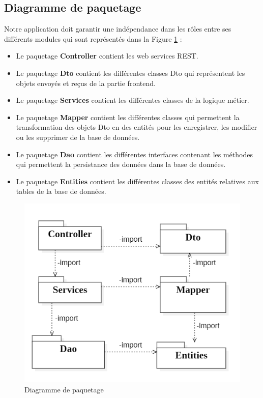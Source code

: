  \subsection{Diagramme de paquetage}
 Notre application doit garantir une indépendance dans les rôles entre ses différents modules qui sont représentés dans la Figure \ref{fig:diagram_package} :
 \begin{itemize}
     \item Le paquetage \textbf{Controller} contient les web services REST.
     \item Le paquetage \textbf{Dto} contient les différentes classes Dto qui représentent les objets envoyés et reçus de la partie frontend.
     \item Le paquetage \textbf{Services} contient les différentes classes de la logique métier.
     \item Le paquetage \textbf{Mapper} contient les différentes classes qui permettent la transformation des objets Dto en des entités pour les enregistrer, les modifier ou les supprimer de la base de données.
     \item Le paquetage \textbf{Dao} contient les différentes interfaces contenant les méthodes qui permettent la persistance des données dans la base de données.
     \item Le paquetage \textbf{Entities} contient les différentes classes des entités relatives aux tables de la base de données.
 \end{itemize}
  \begin{figure}[H]
     \centering
     \includegraphics[scale=0.8]{img/Package Diagram.png}
     \caption{Diagramme de paquetage}
     \label{fig:diagram_package}
 \end{figure}
